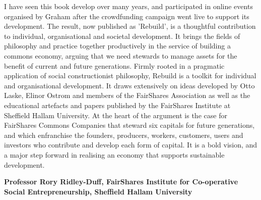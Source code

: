 \noindent I have seen this book develop over many years, and participated in online events organised by Graham after the crowdfunding campaign went live to support its development. The result, now published as 'Rebuild', is a thoughtful contribution to individual, organisational and societal development. It brings the fields of philosophy and practice together productively in the service of building a commons economy, arguing that we need stewards to manage assets for the benefit of current and future generations. 
Firmly rooted in a pragmatic application of social constructionist philosophy, Rebuild is a toolkit for individual and organisational development. It draws extensively on ideas developed by Otto Laske, Elinor Ostrom and members of the FairShares Association as well as the educational artefacts and papers published by the FairShares Institute at Sheffield Hallam University. At the heart of the argument is the case for FairShares Commons Companies that steward six capitals for future generations, and which enfranchise the founders, producers, workers, customers, users and investors who contribute and develop each form of capital. It is a bold vision, and a major step forward in realising an economy that supports sustainable development.


{\raggedleft \textemdash \textbf{Professor Rory Ridley-Duff,  
FairShares Institute for Co-operative Social Entrepreneurship, 
Sheffield Hallam University }}
\vspace{1.5ex}